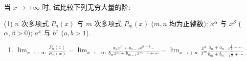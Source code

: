 \begin{exercise}[1.3.17]
    当 $x \to +\infty$ 时, 试比较下列无穷大量的阶:
    \begin{tasks}[label=(\arabic*)](1)
        \task $n$ 次多项式 $P_n(x)$ 与 $m$ 次多项式 $P_m(x)$ ($m,n$ 均为正整数);
        \task $x^\alpha$ 与 $x^\beta$ ($\alpha, \beta > 0$);
        \task $a^x$ 与 $b^x$ ($a, b > 1$).
    \end{tasks}
\end{exercise}
\begin{solution}
    \begin{enumerate}[(1)]
        \item 
        $\lim_{x \to +\infty} \frac{P_n(x)}{P_m(x)} = \lim_{x \to +\infty} \frac{a_n x^n +a_{n-1} x^{n-1} \cdots}{b_m x^m +b_{m-1} x^{m-1} +\cdots} 
        = \lim_{x \to +\infty} \frac{x^n}{x^m}\frac{a_n  +a_{n-1} \frac{1}{x} +\cdots}{b_m + b_{m-1}\frac{1}{x} +\cdots}$ 
        

\end{enumerate}
\end{solution}
